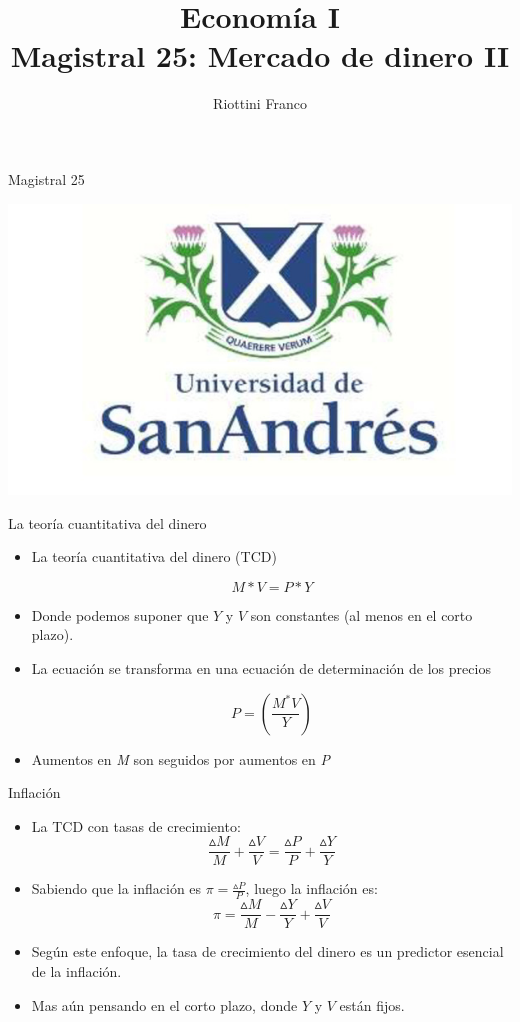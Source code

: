 \documentclass{beamer}
\title[Economía I]{Economía I \vspace{4mm}
\\ Magistral 25: Mercado de dinero II}
\date{}
\author[Riottini]{Riottini Franco}
\institute[]{Universidad de San Andrés}
\begin{document}
\begin{frame}
\titlepage
\centering
Magistral 25

\includegraphics[scale=0.2]{../Figures/logoUDESA.jpg} 
\end{frame}



\begin{frame}{La teoría cuantitativa del dinero}
    \begin{itemize}
        \item La teoría cuantitativa del dinero (TCD)
            
        $$M*V=P*Y$$

        \item Donde podemos suponer que $Y$ y $V$ son constantes (al menos en el corto plazo).
        \item La ecuación se transforma en una ecuación de determinación de los precios
        
        $$P=\left(\frac{M^{*} V}{Y}\right)$$

        \item Aumentos en \textit{M} son seguidos por aumentos en \textit{P}
    \end{itemize}
        
\end{frame}

\begin{frame}{Inflación}
    \begin{itemize}
    \item La TCD con tasas de crecimiento:
        $$\frac{\vartriangle M}{M} + \frac{\vartriangle V}{V} = \frac{\vartriangle P}{P} + \frac{\vartriangle Y}{Y}$$
    \item Sabiendo que la inflación es $\pi = \frac{\vartriangle P}{P}$, luego la inflación es:
        $$\pi = \frac{\vartriangle M}{M} - \frac{\vartriangle Y}{Y} + \frac{\vartriangle V}{V}$$
    \item Según este enfoque, la tasa de crecimiento del dinero es un predictor esencial de la inflación.
    \item Mas aún pensando en el corto plazo, donde $Y$ y $V$ están fijos.
    \end{itemize}
\end{frame}
\end{document}
